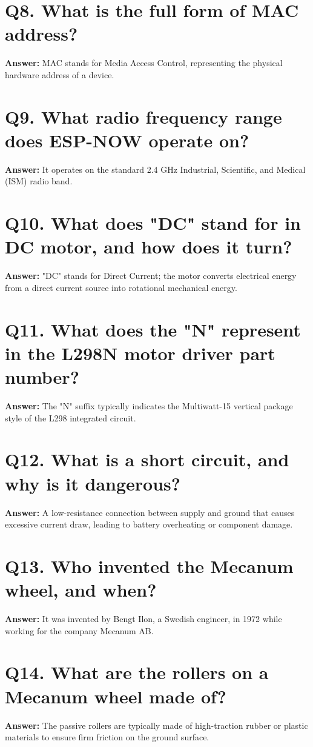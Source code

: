 \documentclass[12pt,a4paper,oneside]{report}
\begin{document}
\section{Q8. What is the full form of MAC address?}
\textbf{Answer:} MAC stands for Media Access Control, representing the physical hardware address of a device.

\section{Q9. What radio frequency range does ESP-NOW operate on?}
\textbf{Answer:} It operates on the standard 2.4 GHz Industrial, Scientific, and Medical (ISM) radio band.

\section{Q10. What does "DC" stand for in DC motor, and how does it turn?}
\textbf{Answer:} "DC" stands for Direct Current; the motor converts electrical energy from a direct current source into rotational mechanical energy.

\section{Q11. What does the "N" represent in the L298N motor driver part number?}
\textbf{Answer:} The "N" suffix typically indicates the Multiwatt-15 vertical package style of the L298 integrated circuit.

\section{Q12. What is a short circuit, and why is it dangerous?}
\textbf{Answer:} A low-resistance connection between supply and ground that causes excessive current draw, leading to battery overheating or component damage.

\section{Q13. Who invented the Mecanum wheel, and when?}
\textbf{Answer:} It was invented by Bengt Ilon, a Swedish engineer, in 1972 while working for the company Mecanum AB.

\section{Q14. What are the rollers on a Mecanum wheel made of?}
\textbf{Answer:} The passive rollers are typically made of high-traction rubber or plastic materials to ensure firm friction on the ground surface.
\end{document}
